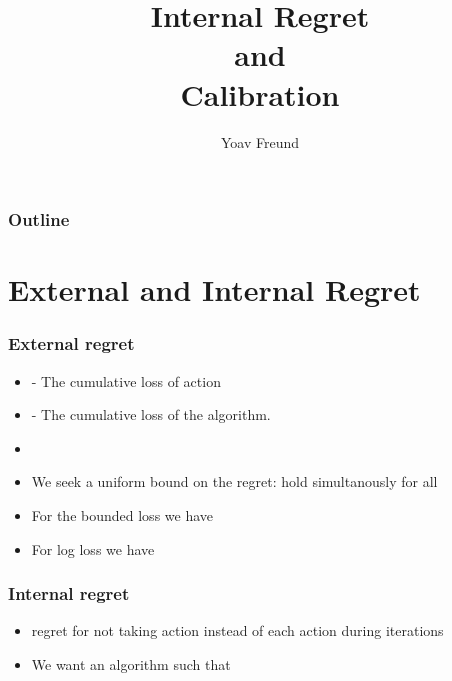 \documentclass{beamer}
\title[Internal Regret and Calibration]%
{Internal Regret \\ and \\ Calibration}
\author[Freund] %
{Yoav Freund}
\institute[Universities of Somewhere and Elsewhere] %
\begin{document}

\begin{frame}
  \titlepage
\end{frame}

\begin{frame}
  \frametitle{Outline}
  \tableofcontents[pausesections]
\end{frame}

\section{External and Internal Regret}

\begin{frame}
\frametitle{External regret}
\begin{itemize}
\item {} - The cumulative loss of action 
\item {} - The cumulative loss of the algorithm.
\item {} 
\item We seek a uniform bound on the regret: hold simultanously for
  all 
\item For the bounded loss  we have 
\item For log loss we have 
\end{itemize}
\end{frame}

\begin{frame}
\frametitle{Internal regret}
\begin{itemize}
\item {} regret for not taking action  instead of
  each action  during iterations 
\item We want an algorithm such that 
\end{itemize}
\end{frame}
\end{document}
